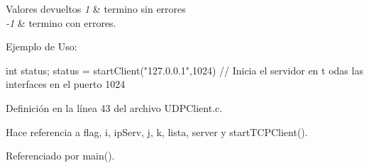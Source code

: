 \begin{DoxyRetVals}{Valores devueltos}
{\em 1} & termino sin errores \\
\hline
{\em -\/1} & termino con errores.\\
\hline
\end{DoxyRetVals}
Ejemplo de Uso: 
\begin{DoxyCode}
                int status;
                status = startClient("127.0.0.1",1024) // Inicia el servidor en t
      odas las interfaces en el puerto 1024 
\end{DoxyCode}
 

Definición en la línea 43 del archivo UDPClient.c.



Hace referencia a flag, i, ipServ, j, k, lista, server y startTCPClient().



Referenciado por main().


